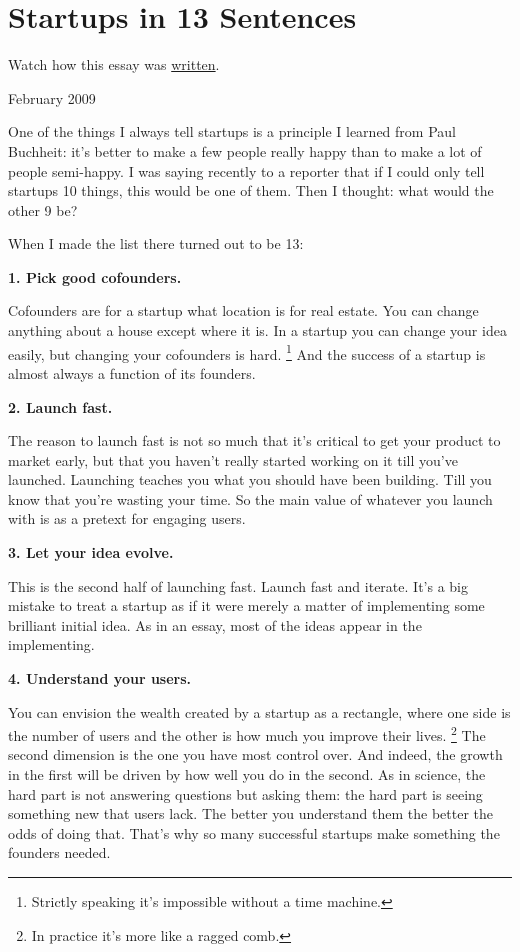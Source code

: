 \chapter{Startups in 13 Sentences}

Watch how this essay was
\href{https://byronm.com/13sentences.html}{written}.

February 2009

One of the things I always tell startups is a principle I learned from
Paul Buchheit: it's better to make a few people really happy than to
make a lot of people semi-happy. I was saying recently to a reporter
that if I could only tell startups 10 things, this would be one of them.
Then I thought: what would the other 9 be?

When I made the list there turned out to be 13:

\textbf{1. Pick good cofounders.}

Cofounders are for a startup what location is for real estate. You can
change anything about a house except where it is. In a startup you can
change your idea easily, but changing your cofounders is hard.
\footnote{Strictly speaking it's impossible without a time machine.} And the success of a startup is almost always a
function of its founders.

\textbf{2. Launch fast.}

The reason to launch fast is not so much that it's critical to get your
product to market early, but that you haven't really started working on
it till you've launched. Launching teaches you what you should have been
building. Till you know that you're wasting your time. So the main value
of whatever you launch with is as a pretext for engaging users.

\textbf{3. Let your idea evolve.}

This is the second half of launching fast. Launch fast and iterate. It's
a big mistake to treat a startup as if it were merely a matter of
implementing some brilliant initial idea. As in an essay, most of the
ideas appear in the implementing.

\textbf{4. Understand your users.}

You can envision the wealth created by a startup as a rectangle, where
one side is the number of users and the other is how much you improve
their lives. \footnote{In practice it's more like a ragged comb.} The second dimension is the one you
have most control over. And indeed, the growth in the first will be
driven by how well you do in the second. As in science, the hard part is
not answering questions but asking them: the hard part is seeing
something new that users lack. The better you understand them the better
the odds of doing that. That's why so many successful startups make
something the founders needed.


